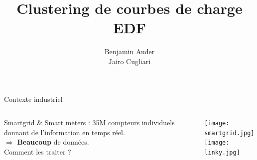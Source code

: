 
\title[Clustering de courbes de charge EDF]
{Clustering de courbes de charge EDF%
\vspace*{0.5cm}}
\author[Benjamin Auder, Jairo Cugliari]
{Benjamin Auder \\[0.2cm]Jairo Cugliari \hspace*{0.6cm}\vspace*{1cm}}
\date[]{}



\begin{frame}
\vspace*{0.5cm}
\titlepage
\end{frame}

\begin{frame}{Contexte industriel}

\begin{columns}

Smartgrid \& Smart meters : 35M compteurs individuels donnant de l'information en temps réel.\\[0.7cm]
$\Rightarrow$ \textbf{Beaucoup} de données.\\[1cm]
Comment les traiter ?

\texttt{[image: smartgrid.jpg]}\\
\texttt{[image: linky.jpg]} 

\end{columns}

\end{frame}

